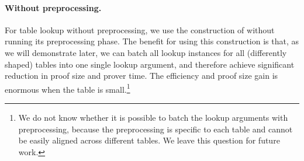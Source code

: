 \paragraph{Without preprocessing.}
For table lookup without preprocessing,
    we use the construction of \cite{cq++24} without running
    its preprocessing phase.
    The benefit for using this construction is that,
    as we will demonstrate later,
    we can batch all lookup instances for all (differently shaped) tables
    into one single lookup argument, and therefore achieve significant 
    reduction in proof size and prover time.
    The efficiency and proof size gain is enormous
    when the table is small.\footnote{
        We do not know whether it is possible to batch the lookup arguments with preprocessing, because the preprocessing is specific to each table and cannot be easily aligned across different tables.
        We leave this question for future work.
    }

